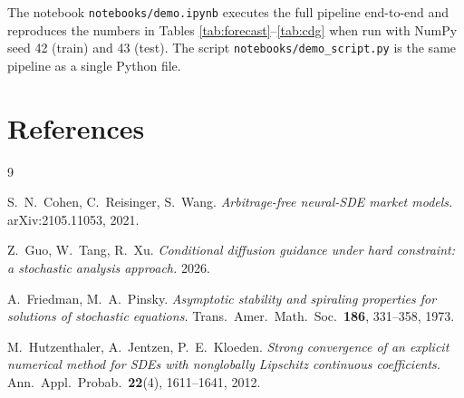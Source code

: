 \documentclass[11pt]{article}
\newcommand{\1}{\mathbf{1}}
\begin{document}
The notebook \texttt{notebooks/demo.ipynb} executes the full pipeline end-to-end and reproduces the numbers in Tables \ref{tab:forecast}--\ref{tab:cdg} when run with NumPy seed 42 (train) and 43 (test). The script \texttt{notebooks/demo\_script.py} is the same pipeline as a single Python file.

\section*{References}

\renewcommand{\section}[2]{}
\begin{thebibliography}{9}

S.\ N.\ Cohen, C.\ Reisinger, S.\ Wang.
\textit{Arbitrage-free neural-SDE market models.}
arXiv:2105.11053, 2021.

Z.\ Guo, W.\ Tang, R.\ Xu.
\textit{Conditional diffusion guidance under hard constraint: a stochastic analysis approach.}
2026.

A.\ Friedman, M.\ A.\ Pinsky.
\textit{Asymptotic stability and spiraling properties for solutions of stochastic equations.}
Trans.\ Amer.\ Math.\ Soc.\ \textbf{186}, 331--358, 1973.

M.\ Hutzenthaler, A.\ Jentzen, P.\ E.\ Kloeden.
\textit{Strong convergence of an explicit numerical method for SDEs with nonglobally Lipschitz continuous coefficients.}
Ann.\ Appl.\ Probab.\ \textbf{22}(4), 1611--1641, 2012.

\end{thebibliography}
\end{document}
